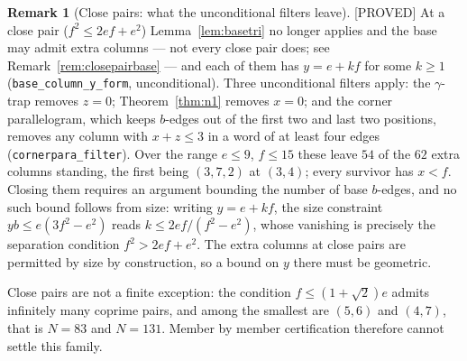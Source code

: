 \documentclass[11pt,reqno]{amsart}
\theoremstyle{plain}
\theoremstyle{definition}
\newtheorem{remark}[theorem]{Remark}
\newcommand{\lab}[1]{\hfill\textnormal{\footnotesize\textsc{[#1]}}}
\begin{document}
\begin{remark}[Close pairs: what the unconditional filters leave]\label{rem:closepairs}\lab{PROVED}
At a close pair ($f^2\le 2ef+e^2$) Lemma~\ref{lem:basetri} no longer applies and the base may admit
extra columns --- not every close pair does; see Remark~\ref{rem:closepairbase} --- and each of
them has $y=e+kf$ for some $k\ge1$ (\texttt{base\_column\_y\_form}, unconditional). Three unconditional filters apply: the
$\gamma$-trap removes $z=0$; Theorem~\ref{thm:n1} removes $x=0$; and the corner parallelogram,
which keeps $b$-edges out of the first two and last two positions, removes any column with
$x+z\le3$ in a word of at least four edges (\texttt{cornerpara\_filter}). Over the range
$e\le9$, $f\le15$ these leave $54$ of the $62$ extra columns standing, the first being
$(3,7,2)$ at $(3,4)$; every survivor has $x<f$. Closing them requires an argument bounding the
number of base $b$-edges, and no such bound follows from size: writing $y=e+kf$, the size
constraint $yb\le e(3f^2-e^2)$ reads $k\le 2ef/(f^2-e^2)$, whose vanishing is precisely the
separation condition $f^2>2ef+e^2$. The extra columns at close pairs are permitted by size by
construction, so a bound on $y$ there must be geometric.

Close pairs are not a finite exception: the condition $f\le(1+\sqrt2)e$ admits infinitely many
coprime pairs, and among the smallest are $(5,6)$ and $(4,7)$, that is $N=83$ and $N=131$. Member
by member certification therefore cannot settle this family.
\end{remark}
\end{document}
